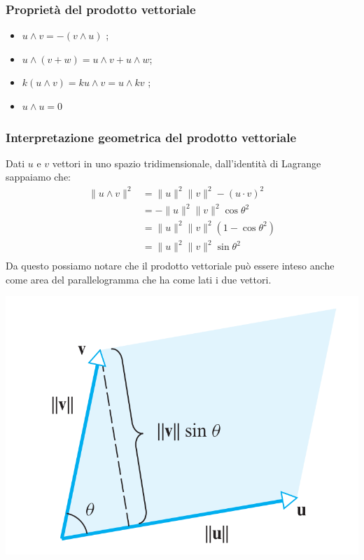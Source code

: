 \documentclass[x11names]{article}
\begin{document}
\subsubsection{Proprietà del prodotto vettoriale}
\begin{itemize}
	\item $u \wedge v = -\left(v\wedge u\right)$ ;
	\item $u \wedge \left(v+w\right) = u\wedge v + u \wedge w$;
	\item $k\left(u\wedge v\right) = ku \wedge v = u \wedge kv$ ;
	\item $u \wedge u = 0$
\end{itemize}

\subsubsection{Interpretazione geometrica del prodotto vettoriale}
Dati $u$ e $v$ vettori in uno spazio tridimensionale, dall'identità di Lagrange sappaiamo che:
\begin{align*}
	\|u\wedge v\|^2 &= \|u\|^2\|v\|^2 - \left(u\cdot v\right)^2 \\
			&= - \|u\|^2\|v\|^2\cos{\theta}^2 \\
			&= \|u\|^2\|v\|^2 \left(1-\cos{\theta}^2\right) \\
			&= \|u\|^2\|v\|^2 \sin{\theta}^2 \\
\end{align*}
\noindent
Da questo possiamo notare che il prodotto vettoriale può essere inteso anche come area del parallelogramma che ha come lati i due vettori. 

\begin{center}
\includegraphics[scale=0.25]{figures/uedge.png}
\end{center}
\end{document}
